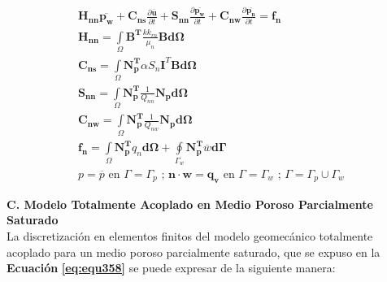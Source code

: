 \begin{ceqn} 
\begin{subequations} \label{eq:equ373} 
\begin{gather}
\mathbf{H_{nn}}\mathbf{\overline{p_w}} + \mathbf{C_{ns}}\frac{\partial \mathbf{\overline{u}}}{\partial t} + \mathbf{S_{nn}}\frac{\partial \mathbf{\overline{p_w}}}{\partial t} + \mathbf{C_{nw}}\frac{\partial \mathbf{\overline{p_n}}}{\partial t} = \mathbf{f_n}\label{eq:equ373a}\\[12pt]
\mathbf{H_{nn}} = \int\limits_\Omega \mathbf{B^T} \frac{k k_{rn}}{\mu_{n}}\mathbf{B}\mathbf{d\Omega} \label{eq:equ373b}\\[12pt]
\mathbf{C_{ns}} =  \int\limits_\Omega \mathbf{N_{p}^T}\alpha S_n\mathbf{I}^T\mathbf{B}\mathbf{d\Omega} \label{eq:equ373c}\\[12pt]
\mathbf{S_{nn}} =  \int\limits_\Omega \mathbf{N_p^T}\frac{1}{Q_{nn}}\mathbf{N_p}\mathbf{d\Omega} \label{eq:equ373d}\\[12pt]
\mathbf{C_{nw}} =  \int\limits_\Omega \mathbf{N_p^T}\frac{1}{Q_{nw}}\mathbf{N_p}\mathbf{d\Omega} \label{eq:equ373e}\\[12pt]
\mathbf{f_n} = \int\limits_\Omega \mathbf{N_{p}^T}q_n\mathbf{d\Omega} + \oint\limits_{\Gamma_{w}}  \mathbf{N_{p}^T} \overline{w} \mathbf{d\Gamma} \label{eq:equ373f}\\[12pt]
p = \overline{p} \text{  en  } \Gamma = \Gamma_p \text{ ;  } \mathbf{n}\cdot\mathbf{w}=\mathbf{q_v} \text{  en  } \Gamma = \Gamma_w \text{ ; } \Gamma = \Gamma_p \cup \Gamma_w \label{eq:equ373g}
\end{gather}  
\end{subequations} 
\end{ceqn}

\bigskip
\textbf{C. Modelo Totalmente Acoplado en Medio Poroso Parcialmente Saturado}\\
La discretización en elementos finitos del modelo geomecánico totalmente acoplado para un medio poroso parcialmente saturado, que se expuso en la \textbf{Ecuación} \textbf{\ref{eq:equ358}} se puede expresar de la siguiente manera:\bigskip

